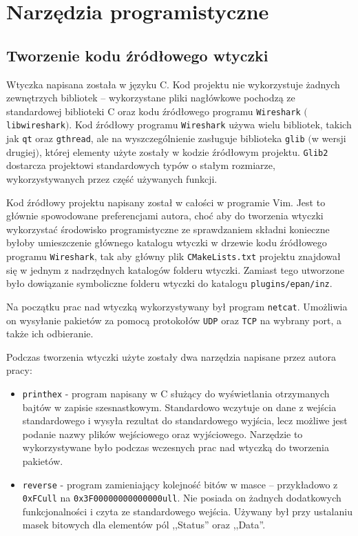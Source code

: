 \documentclass[a4paper, 12pt, twoside, openright]{article}
\begin{document}
\newpage
\section{Narzędzia programistyczne}

	\subsection{Tworzenie kodu źródłowego wtyczki}
	\indent\par
	Wtyczka napisana została w języku C. Kod projektu nie wykorzystuje żadnych zewnętrzych bibliotek -- wykorzystane pliki nagłówkowe
	pochodzą ze standardowej biblioteki C oraz kodu źródłowego programu \texttt{Wireshark} $($\texttt{libwireshark}$)$.
	Kod źródłowy programu \texttt{Wireshark} używa wielu bibliotek, takich jak \texttt{qt} oraz \texttt{gthread}, ale na wyszczególnienie
	zasługuje biblioteka \texttt{glib} $($w wersji drugiej$)$, której
	elementy użyte zostały w kodzie źródłowym projektu. \texttt{Glib2} dostarcza projektowi standardowych typów o stałym
	rozmiarze, wykorzystywanych przez część używanych funkcji.

	Kod źródłowy projektu napisany został w całości w programie Vim. Jest to głównie spowodowane preferencjami autora,
	choć aby do tworzenia wtyczki wykorzystać środowisko programistyczne ze sprawdzaniem składni konieczne byłoby umieszczenie
	głównego katalogu wtyczki w drzewie kodu źródłowego programu \texttt{Wireshark}, tak aby główny plik \texttt{CMakeLists.txt} projektu znajdował się w jednym
	z nadrzędnych katalogów folderu wtyczki. Zamiast tego utworzone było dowiązanie symboliczne folderu wtyczki do katalogu
	\texttt{plugins/epan/inz}.

	Na początku prac nad wtyczką wykorzystywany był program \texttt{netcat}. Umożliwia on wysyłanie pakietów
	za pomocą protokołów \texttt{UDP} oraz \texttt{TCP} na wybrany port, a także ich odbieranie.

	Podczas tworzenia wtyczki użyte zostały dwa narzędzia napisane przez autora pracy:
	\begin{itemize}
		\item \texttt{printhex} - program napisany w C służący do wyświetlania otrzymanych bajtów w zapisie szesnastkowym. Standardowo
			wczytuje on dane z wejścia standardowego i wysyła rezultat do standardowego wyjścia, lecz możliwe jest podanie nazwy plików
			wejściowego oraz wyjściowego. Narzędzie to wykorzystywane było podczas wczesnych prac nad wtyczką do tworzenia pakietów.
		\item \texttt{reverse} - program zamieniający kolejność bitów w masce -- przykładowo z \texttt{0xFCull} na \texttt{0x3F00000000000000ull}.
			Nie posiada on żadnych dodatkowych funkcjonalności i czyta ze standardowego wejścia. Używany był przy ustalaniu masek bitowych dla
			elementów pól ,,Status'' oraz ,,Data''.
	\end{itemize}
\end{document}
